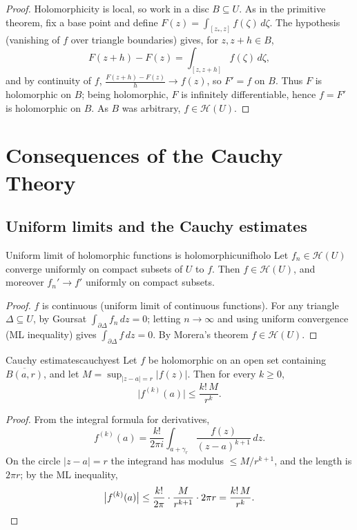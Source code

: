 \documentclass[11pt,openany]{report}
\newcommand{\abs}[1]{\left\lvert #1 \right\rvert}
\newcommand{\Hol}{\mathcal{H}}
\begin{document}
\begin{proof}
Holomorphicity is local, so work in a disc $B\subseteq U$. As in the primitive theorem,
fix a base point and define $F(z)=\int_{[z_*,z]}f(\zeta)\,d\zeta$. The hypothesis (vanishing
of $f$ over triangle boundaries) gives, for $z,z+h\in B$,
\[
  F(z+h)-F(z) = \int_{[z,z+h]} f(\zeta)\,d\zeta,
\]
and by continuity of $f$, $\frac{F(z+h)-F(z)}{h}\to f(z)$, so $F'=f$ on $B$. Thus $F$ is
holomorphic on $B$; being holomorphic, $F$ is infinitely differentiable, hence
$f=F'$ is holomorphic on $B$. As $B$ was arbitrary, $f\in\Hol(U)$.
\end{proof}


\chapter{Consequences of the Cauchy Theory}

\section{Uniform limits and the Cauchy estimates}

\begin{theorem}{Uniform limit of holomorphic functions is holomorphic}{unifholo}
Let $f_n\in\Hol(U)$ converge uniformly on compact subsets of $U$ to $f$. Then
$f\in\Hol(U)$, and moreover $f_n'\to f'$ uniformly on compact subsets.
\end{theorem}

\begin{proof}
$f$ is continuous (uniform limit of continuous functions). For any triangle
$\Delta\subseteq U$, by Goursat $\int_{\partial\Delta}f_n\,dz=0$; letting $n\to\infty$ and
using uniform convergence (ML inequality) gives $\int_{\partial\Delta}f\,dz=0$. By Morera's
theorem $f\in\Hol(U)$.
\end{proof}

\begin{theorem}{Cauchy estimates}{cauchyest}
Let $f$ be holomorphic on an open set containing $\overline{B(a,r)}$, and let
$M=\sup_{\abs{z-a}=r}\abs{f(z)}$. Then for every $k\ge0$,
\[
  \boxed{\ \bigl\lvert f^{(k)}(a)\bigr\rvert \le \frac{k!\,M}{r^{k}}.\ }
\]
\end{theorem}

\begin{proof}
From the integral formula for derivatives,
\[
  f^{(k)}(a) = \frac{k!}{2\pi i}\int_{a+\gamma_r}\frac{f(z)}{(z-a)^{k+1}}\,dz .
\]
On the circle $\abs{z-a}=r$ the integrand has modulus $\le M/r^{k+1}$, and the length is
$2\pi r$; by the ML inequality,
\[
  \bigl\lvert f^{(k)}(a)\bigr\rvert \le \frac{k!}{2\pi}\cdot\frac{M}{r^{k+1}}\cdot 2\pi r
  = \frac{k!\,M}{r^{k}}. \qedhere
\]
\end{proof}
\end{document}
